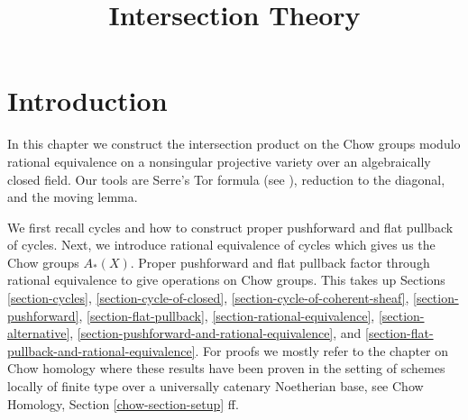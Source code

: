 

%


\title{Intersection Theory}


\maketitle

\label{section-phantom}

\tableofcontents


\section{Introduction}
\label{section-introduction}

\noindent
In this chapter we construct the intersection product on the Chow groups
modulo rational equivalence on a nonsingular projective variety over an
algebraically closed field. Our tools are Serre's Tor formula
(see \cite[Chapter V]{Serre_algebre_locale}), reduction to the diagonal,
and the moving lemma.

\medskip\noindent
We first recall cycles and how to construct proper pushforward and
flat pullback of cycles. Next, we introduce rational equivalence of cycles
which gives us the Chow groups $A_*(X)$. Proper pushforward and flat pullback
factor through rational equivalence to give operations on Chow groups.
This takes up Sections 
\ref{section-cycles},
\ref{section-cycle-of-closed},
\ref{section-cycle-of-coherent-sheaf},
\ref{section-pushforward},
\ref{section-flat-pullback},
\ref{section-rational-equivalence},
\ref{section-alternative},
\ref{section-pushforward-and-rational-equivalence}, and
\ref{section-flat-pullback-and-rational-equivalence}.
For proofs we mostly refer to the chapter on Chow homology
where these results have been proven in the setting of
schemes locally of finite type over a universally catenary Noetherian base, see
Chow Homology, Section \ref{chow-section-setup} ff.

